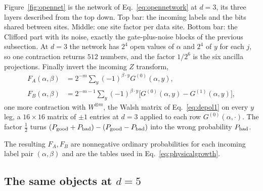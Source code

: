 Figure~\ref{fig:opennet} is the network of Eq.~\eqref{eq:opennetwork} at $d=3$, its three layers described from the top down. Top bar: the incoming labels and the bits shared between sites. Middle: one site factor per data site. Bottom bar: the Clifford part with its noise, exactly the gate-plus-noise blocks of the previous subsection. At $d=3$ the network has $2^{4}$ open values of $\alpha$ and $2^{4}$ of $y$ for each $j$, so one contraction returns $512$ numbers, and the factor $1/2^{6}$ is the six ancilla projections. Finally invert the incoming $Z$ transform,
\begin{align}
 F_A(\alpha,\beta)&=2^{-m}\sum_y(-1)^{\beta\cdot y}G^{(0)}(\alpha,y),
 \nonumber\\
 F_B(\alpha,\beta)&=2^{-m-1}\sum_y(-1)^{\beta\cdot y}\big[G^{(0)}(\alpha,y)-G^{(1)}(\alpha,y)\big],
 \label{eq:inverseF}
\end{align}
one more contraction with $W^{\otimes m}$, the Walsh matrix of Eq.~\eqref{eq:depol1} on every $y$ leg, a $16\times16$ matrix of $\pm1$ entries at $d=3$ applied to each row $G^{(0)}(\alpha,\cdot)$. The factor $\tfrac12$ turns $(P_{\rm good}+P_{\rm bad})-(P_{\rm good}-P_{\rm bad})$ into the wrong probability $P_{\rm bad}$.
\begin{center}
\end{center}
The resulting $F_A,F_B$ are nonnegative ordinary probabilities for each incoming label pair $(\alpha,\beta)$ and are the tables used in Eq.~\eqref{eq:physicalgrowth}.

\subsection{The same objects at \texorpdfstring{$d=5$}{d=5}}\label{app:B-dfive}

